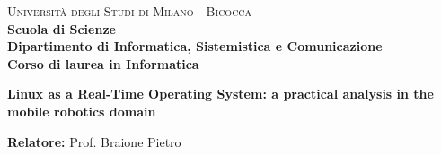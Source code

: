 %
%

\begin{titlepage}

    \noindent
    \begin{minipage}[t]{0.19\textwidth}
    \end{minipage}
    \begin{minipage}[t]{0.81\textwidth}
        {
            {\textsc{Università degli Studi di Milano - Bicocca}} \\
            \textbf{Scuola di Scienze} \\
            \textbf{Dipartimento di Informatica, Sistemistica e Comunicazione} \\
            \textbf{Corso di laurea in Informatica} \\
            \par
        }
    \end{minipage}

    \vspace{35mm}

    \begin{center}
        {\Huge{
                \textbf{Linux as a Real-Time Operating System: a practical analysis in the mobile robotics domain}
                \par
            }
        }
    \end{center}

    \vspace{30mm}

    \noindent
    {\large \textbf{Relatore:} Prof. Braione Pietro } \\


\end{titlepage}
